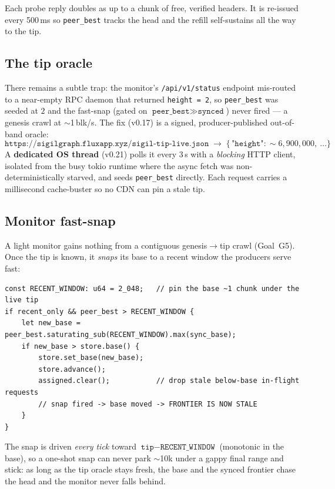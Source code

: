 \documentclass[11pt,a4paper]{article}
\begin{document}
\noindent
Each probe reply doubles as up to a chunk of free, verified headers. It is
re-issued every 500\,ms so \texttt{peer\_best} tracks the head and the refill
self-sustains all the way to the tip.

\subsection{The tip oracle}

There remains a subtle trap: the monitor's \verb!/api/v1/status! endpoint
mis-routed to a near-empty RPC daemon that returned \texttt{height = 2}, so
\texttt{peer\_best} was seeded at $2$ and the fast-snap (gated on
$\texttt{peer\_best} \gg \texttt{synced}$) never fired --- a genesis crawl at
$\sim$1\,blk/s. The fix (v0.17) is a signed, producer-published out-of-band
oracle:
\[
  \texttt{https://sigilgraph.fluxapp.xyz/sigil-tip-live.json} \;\to\;
  \{\,\texttt{"height"}: \sim\!6{,}900{,}000,\ \dots\}
\]
A \textbf{dedicated OS thread} (v0.21) polls it every 3\,s with a
\emph{blocking} HTTP client, isolated from the busy tokio runtime where the async
fetch was non-deterministically starved, and seeds \texttt{peer\_best} directly.
Each request carries a millisecond cache-buster so no CDN can pin a stale tip.

\subsection{Monitor fast-snap}

A light monitor gains nothing from a contiguous genesis$\to$tip crawl
(Goal~G5). Once the tip is known, it \emph{snaps} its base to a recent window the
producers serve fast:

\begin{lstlisting}
const RECENT_WINDOW: u64 = 2_048;   // pin the base ~1 chunk under the live tip
if recent_only && peer_best > RECENT_WINDOW {
    let new_base = peer_best.saturating_sub(RECENT_WINDOW).max(sync_base);
    if new_base > store.base() {
        store.set_base(new_base);
        store.advance();
        assigned.clear();           // drop stale below-base in-flight requests
        // snap fired -> base moved -> FRONTIER IS NOW STALE
    }
}
\end{lstlisting}

\noindent
The snap is driven \emph{every tick} toward $\texttt{tip} - \texttt{RECENT\_WINDOW}$
(monotonic in the base), so a one-shot snap can never park $\sim$10k under a gappy
final range and stick: as long as the tip oracle stays fresh, the base and the
synced frontier chase the head and the monitor never falls behind.
\end{document}
